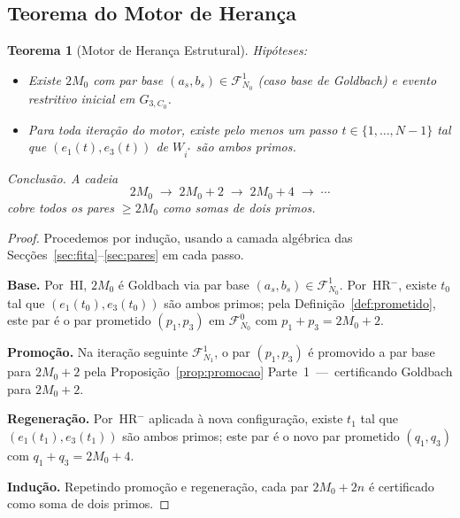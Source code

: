 \documentclass[12pt, a4paper]{article}
\theoremstyle{plain}
\newtheorem{theorem}{Teorema}[section]
\theoremstyle{definition}
\theoremstyle{remark}
\begin{document}
	\subsection{Teorema do Motor de Herança}
	
	\begin{theorem}[Motor de Herança Estrutural]
		\label{thm:motor}
		\textit{Hipóteses:}
		\begin{itemize}
			\item[\textbf{(HI)}] Existe $2M_0$ com par base
			$(a_s,b_s)\in\mathcal{F}_{N_0}^1$ (caso base de Goldbach)
			e evento restritivo inicial em $G_{3,C_0}$.
			\item[\textbf{(HR$^-$)}] Para toda iteração do motor, existe
			pelo menos um passo $t\in\{1,\ldots,N-1\}$ tal que
			$(e_1(t),e_3(t))$ de $W_{i^*}$ são ambos primos.
		\end{itemize}
		
		\textit{Conclusão.}  A cadeia
		\[
		2M_0 \;\longrightarrow\; 2M_0+2 \;\longrightarrow\; 2M_0+4
		\;\longrightarrow\; \cdots
		\]
		cobre todos os pares $\geq 2M_0$ como somas de dois primos.
	\end{theorem}
	
	\begin{proof}
		Procedemos por indução, usando a camada algébrica das
		Secções~\ref{sec:fita}--\ref{sec:pares} em cada passo.
		
		\textbf{Base.}  Por~HI, $2M_0$ é Goldbach via par base
		$(a_s,b_s)\in\mathcal{F}_{N_0}^1$.  Por~HR$^-$, existe $t_0$
		tal que $(e_1(t_0),e_3(t_0))$ são ambos primos; pela
		Definição~\ref{def:prometido}, este par é o par prometido
		$(p_1,p_3)$ em $\mathcal{F}_{N_0}^0$ com
		$p_1+p_3=2M_0+2$.
		
		\textbf{Promoção.}  Na iteração seguinte $\mathcal{F}_{N_1}^1$,
		o par $(p_1,p_3)$ é promovido a par base para $2M_0+2$
		pela Proposição~\ref{prop:promocao} Parte~1~---~certificando
		Goldbach para $2M_0+2$.
		
		\textbf{Regeneração.}  Por~HR$^-$ aplicada à nova configuração,
		existe $t_1$ tal que $(e_1(t_1),e_3(t_1))$ são ambos primos;
		este par é o novo par prometido $(q_1,q_3)$ com
		$q_1+q_3=2M_0+4$.
		
		\textbf{Indução.}  Repetindo promoção e regeneração, cada par
		$2M_0+2n$ é certificado como soma de dois primos.
	\end{proof}
	
\end{document}
